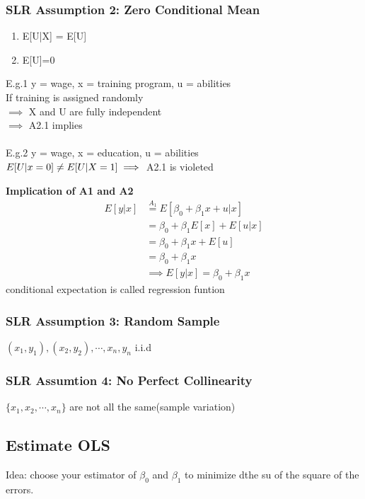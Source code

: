 \documentclass{article}
\theoremstyle{definition}
\theoremstyle{thrm}
\theoremstyle{lma}
\theoremstyle{ppst}
\theoremstyle{crlr}
\begin{document}
\subsubsection{SLR Assumption 2: Zero Conditional Mean}
\begin{enumerate}
	\item E[U|X] = E[U]
	\item E[U]=0
\end{enumerate}
E.g.1 y = wage, x = training program, u = abilities\\
If training is assigned randomly\\
$\implies$ X and U are fully independent\\
$\implies$ A2.1 implies\\
\\
E.g.2 y = wage, x = education, u = abilities\\
$E[U|x=0]\neq E[U|X=1]\\ \implies$ A2.1 is violeted

\textbf{Implication of A1 and A2}
\begin{align*}
	E[y|x] &\stackrel{A_1}{=} E[\beta_0+\beta_1x+u|x]\\
	&= \beta_0+\beta_1E[x]+E[u|x]\\
	&=\beta_0+\beta_1x+E[u]\\
	&= \beta_0+\beta_1x\\
	&\implies E[y|x] = \beta_0+\beta_1x
\end{align*}
conditional expectation is called regression funtion

\subsubsection{SLR Assumption 3: Random Sample}
$(x_1,y_1), (x_2,y_2),\cdots, x_n,y_n$ i.i.d

\subsubsection{SLR Assumtion 4: No Perfect Collinearity}
$\{x_1, x_2,\cdots, x_n\}$ are not all the same(sample variation)
\pagebreak
\subsection{Estimate OLS}
Idea: choose your estimator of $\beta_0$ and $\beta_1$ to minimize dthe su of the  square of the errors.
\end{document}
